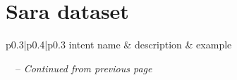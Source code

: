 \documentclass[bsc,frontabs,singlespacing,parskip,deptreport]{infthesis}
\begin{document}
\chapter{Sara dataset}{
  \label{chap:A-Sara}
  \begin{center}
    \begin{longtable}{p{}|p{}|p{}}
    \hline
    intent name & description & example \\ 
    \hline
    \endfirsthead
    
    \hline
    {\tablename\ \thetable\ -- \textit{Continued from previous page}} \\
    \hline
    \endhead

    \hline 
     \\
    \endfoot
    \endlastfoot


\end{longtable}
\end{center}}
\end{document}
